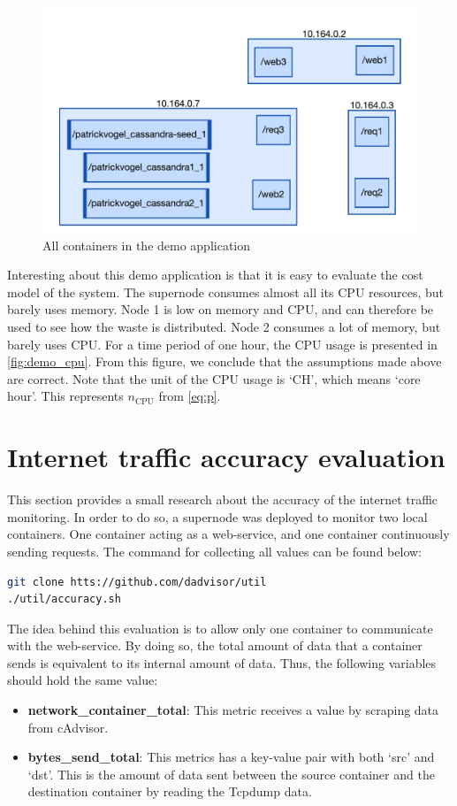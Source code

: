 \begin{figure}
    \centering
    \includegraphics[width=\textwidth]{gfx/demo_app}
    \caption{All containers in the demo application}
    \label{fig:demo_app}
\end{figure}

\noindent
Interesting about this demo application is that it is easy to evaluate the cost model of the system. The supernode consumes almost all its CPU resources, but barely uses memory. Node 1 is low on memory and CPU, and can therefore be used to see how the waste is distributed. Node 2 consumes a lot of memory, but barely uses CPU. For a time period of one hour, the CPU usage is presented in \autoref{fig:demo_cpu}. From this figure, we conclude that the assumptions made above are correct. Note that the unit of the CPU usage is `CH', which means `core hour'. This represents $n_\text{CPU}$ from \autoref{eq:p}.


\section{Internet traffic accuracy evaluation} \label{sec:eval_k}
This section provides a small research about the accuracy of the internet traffic monitoring. In order to do so, a supernode was deployed to monitor two local containers. One container acting as a web-service, and one container continuously sending requests. The command for collecting all values can be found below:

\begin{lstlisting}[language=bash, caption=Docker-compose]
git clone htts://github.com/dadvisor/util
./util/accuracy.sh
\end{lstlisting}

\noindent
The idea behind this evaluation is to allow only one container to communicate with the web-service. By doing so, the total amount of data that a container sends is equivalent to its internal amount of data. Thus, the following variables should hold the same value:
\begin{itemize}
    \item \textbf{network\_container\_total}: This metric receives a value by scraping data from cAdvisor.
    \item \textbf{bytes\_send\_total}: This metrics has a key-value pair with both `src' and `dst'. This is the amount of data sent between the source container and the destination container by reading the Tcpdump data.
\end{itemize}

